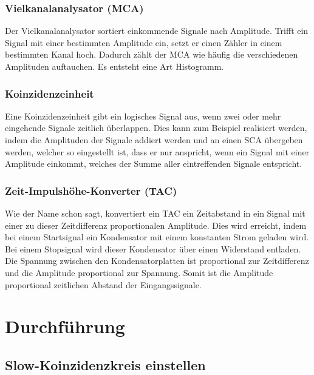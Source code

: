 \subsection{Vielkanalanalysator (MCA)}

Der Vielkanalanalysator sortiert einkommende Signale nach Amplitude. Trifft ein
Signal mit einer bestimmten Amplitude ein, setzt er einen Zähler in einem
bestimmten Kanal hoch. Dadurch zählt der MCA wie häufig die verschiedenen
Amplituden auftauchen. Es entsteht eine Art Histogramm.

\subsection{Koinzidenzeinheit}

Eine Koinzidenzeinheit gibt ein logisches Signal aus, wenn zwei oder mehr
eingehende Signale zeitlich überlappen. Dies kann zum Beispiel realisiert
werden, indem die Amplituden der Signale addiert werden und an einen SCA
übergeben werden, welcher so eingestellt ist, dass er nur anspricht, wenn ein
Signal mit einer Amplitude einkommt, welches der Summe aller eintreffenden
Signale entspricht.

\subsection{Zeit-Impulshöhe-Konverter (TAC)}

Wie der Name schon sagt, konvertiert ein TAC ein Zeitabstand in ein Signal mit
einer zu dieser Zeitdifferenz proportionalen Amplitude. Dies wird erreicht,
indem bei einem Startsignal ein Kondensator mit einem konstanten Strom geladen
wird. Bei einem Stopsignal wird dieser Kondensator über einen Widerstand
entladen. Die Spannung zwischen den Kondensatorplatten ist proportional zur
Zeitdifferenz und die Amplitude proportional zur Spannung. Somit ist die
Amplitude proportional zeitlichen Abstand der Eingangssignale.


\chapter{Durchführung}

\section{Slow-Koinzidenzkreis einstellen}

